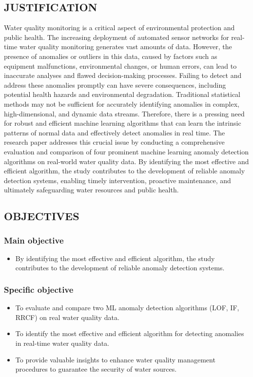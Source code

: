 \documentclass[12pt]{report}
\begin{document}
\subsection{JUSTIFICATION}
\par
Water quality monitoring is a critical aspect of environmental protection and public health. The increasing deployment of automated sensor networks for real-time water quality monitoring generates vast amounts of data. However, the presence of anomalies or outliers in this data, caused by factors such as equipment malfunctions, environmental changes, or human errors, can lead to inaccurate analyses and flawed decision-making processes. Failing to detect and address these anomalies promptly can have severe consequences, including potential health hazards and environmental degradation. Traditional statistical methods may not be sufficient for accurately identifying anomalies in complex, high-dimensional, and dynamic data streams. Therefore, there is a pressing need for robust and efficient machine learning algorithms that can learn the intrinsic patterns of normal data and effectively detect anomalies in real time. The research paper addresses this crucial issue by conducting a comprehensive evaluation and comparison of four prominent machine learning anomaly detection algorithms on real-world water quality data. By identifying the most effective and efficient algorithm, the study contributes to the development of reliable anomaly detection systems, enabling timely intervention, proactive maintenance, and ultimately safeguarding water resources and public health.
\subsection{OBJECTIVES}
\subsubsection{Main objective}
\begin{itemize}
    \item By identifying the most effective and efficient algorithm, the study contributes to the development of reliable anomaly detection systems.
\end{itemize}
\subsubsection{Specific objective}
\begin{itemize}
    \item To evaluate and compare two ML anomaly detection algorithms (LOF, IF, RRCF) on real water quality data.
\item To identify the most effective and efficient algorithm for detecting anomalies in real-time water quality data.
\item To provide valuable insights to enhance water quality management procedures to guarantee the security of water sources.
\end{itemize}
\end{document}
